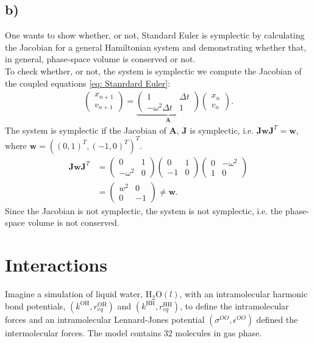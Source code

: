 \documentclass[a4paper]{article}
\newcommand{\w}{\omega}
\newcommand{\nl}{\\\newline\noindent}
\begin{document}
\subsection*{b)}
One wants to show whether, or not, Standard Euler is symplectic by calculating the Jacobian for a general Hamiltonian system and demonstrating whether that, in general, phase-space volume is conserved or not.
\nl
To check whether, or not, the system is symplectic we compute the Jacobian of the coupled equations \eqref{eq: Stanrdard Euler}:
\begin{align*}
    \begin{pmatrix}
        x_{n+1}\\
        v_{n+1}
    \end{pmatrix} = \underbrace{\begin{pmatrix}
        1 & \Delta t\\
        -\w^2\Delta t & 1
    \end{pmatrix}}_{\mathbf{A}}\begin{pmatrix}x_n\\v_n\end{pmatrix}.
\end{align*}The system is symplectic if the Jacobian of $\mathbf{A}$, $\mathbf{J}$ is symplectic, i.e. $\mathbf{J}\mathbf{w}\mathbf{J}^T=\mathbf{w}$, where $\mathbf{w} = ((0, 1)^T, (-1, 0)^T)^T$.
\begin{align*}
    \mathbf{J}\mathbf{w}\mathbf{J}^T &= \begin{pmatrix}
        0 & 1\\
        -\w^2 & 0
    \end{pmatrix}\begin{pmatrix}
        0 & 1\\
        -1 & 0
    \end{pmatrix}\begin{pmatrix}
        0 & -\w^2\\
        1 & 0
    \end{pmatrix}\\
    &=\begin{pmatrix}
        w^2 & 0 \\
        0 &-1
    \end{pmatrix}\neq\mathbf{w}.
\end{align*}Since the Jacobian is not symplectic, the system is not symplectic, i.e. the phase-space volume is not conserved.

\section*{Interactions}
Imagine a simulation of liquid water, H$_2$O$(l)$, with an intramolecular harmonic bond potentials, $(k^{\text{OH}}, r_{eq}^\text{OH})$ and $(k^{\text{HH}}, r_{eq}^{\text{HH}})$,
to define the intramolecular forces and an intramolecular Lennard-Jones potential $(\sigma^{OO}, \epsilon^{OO})$ defined the intermolecular forces.
The model contains $32$ molecules in gas phase. 
\end{document}
